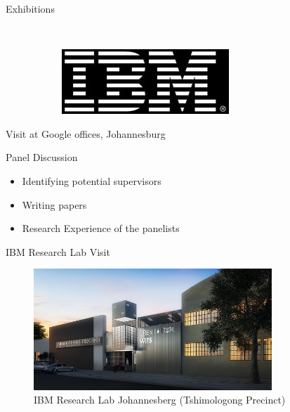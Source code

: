 \documentclass{beamer}
\begin{document}
\begin{frame}{Exhibitions}
\begin{figure}
\begin{subfigure}[b]{0.35\textwidth}
	    \end{subfigure}~
       \hspace*{2cm}
	   \begin{subfigure}[b]{0.35\textwidth}
			    	\includegraphics[width=\textwidth]{ibmlogo.jpg}
	   \end{subfigure}
	   
	\end{figure}
\end{frame}

\begin{frame}{Visit at Google offices, Johannesburg}	
	\begin{figure}[!h]
		\centering	
			\caption{ \only<3>{Meeting Area} }
	\end{figure}	
	
\end{frame}

\begin{frame}{Panel Discussion}
	\begin{itemize}
		\item Identifying potential supervisors
		\item Writing papers
		\item Research Experience of the panelists
	\end{itemize}
\end{frame}


\begin{frame}{IBM Research Lab Visit}
	\begin{figure}
		\includegraphics[width=0.8\textwidth]{ibmafrica.jpg}
		\caption{ IBM Research Lab Johannesberg (Tshimologong Precinct)}
	\end{figure}
\end{frame}
\end{document}

